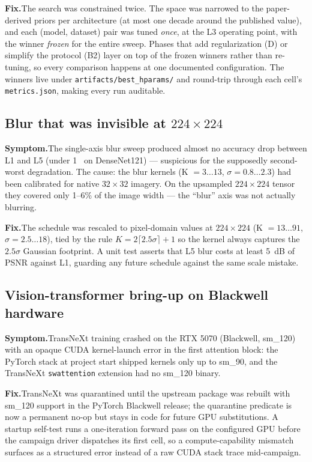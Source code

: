 \textbf{Fix.}\quad The search was constrained twice. The space was narrowed
to the paper-derived priors per architecture (at most one decade around the
published value), and each (model, dataset) pair was tuned \emph{once}, at
the L3 operating point, with the winner \emph{frozen} for the entire sweep.
Phases that add regularization (D) or simplify the protocol (B2) layer on
top of the frozen winners rather than re-tuning, so every comparison happens
at one documented configuration. The winners live under
\texttt{artifacts/best\_hparams/} and round-trip through each cell's
\texttt{metrics.json}, making every run auditable.

\subsection{Blur that was invisible at \texorpdfstring{$224 \times 224$}{224x224}}
\textbf{Symptom.}\quad The single-axis blur sweep produced almost no accuracy
drop between L1 and L5 (under 1~\Mpp{} on DenseNet121) --- suspicious for the
supposedly second-worst degradation. The cause: the blur kernels
(K $= 3 \ldots 13$, $\sigma = 0.8 \ldots 2.3$) had been calibrated for native
$32 \times 32$ imagery. On the upsampled $224 \times 224$ tensor they covered
only 1--6\% of the image width --- the ``blur'' axis was not actually
blurring.

\textbf{Fix.}\quad The schedule was rescaled to pixel-domain values at
$224 \times 224$ (K $= 13 \ldots 91$, $\sigma = 2.5 \ldots 18$), tied by the
rule $K = 2\lceil 2.5\sigma \rceil + 1$ so the kernel always captures the
$2.5\sigma$ Gaussian footprint. A unit test asserts that L5 blur costs at
least 5~dB of PSNR against L1, guarding any future schedule against the same
scale mistake.

\subsection{Vision-transformer bring-up on Blackwell hardware}
\textbf{Symptom.}\quad TransNeXt training crashed on the RTX 5070 (Blackwell,
sm\_120) with an opaque CUDA kernel-launch error in the first attention
block: the PyTorch stack at project start shipped kernels only up to sm\_90,
and the TransNeXt \texttt{swattention} extension had no sm\_120 binary.

\textbf{Fix.}\quad TransNeXt was quarantined until the upstream package was
rebuilt with sm\_120 support in the PyTorch Blackwell release; the quarantine
predicate is now a permanent no-op but stays in code for future GPU
substitutions. A startup self-test runs a one-iteration forward pass on the
configured GPU before the campaign driver dispatches its first cell, so a
compute-capability mismatch surfaces as a structured error instead of a raw
CUDA stack trace mid-campaign.

